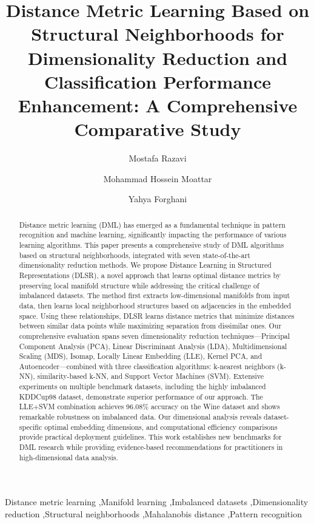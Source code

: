 \documentclass[review]{elsarticle}
\begin{document}
\begin{frontmatter}

\title{Distance Metric Learning Based on Structural Neighborhoods for Dimensionality Reduction and Classification Performance Enhancement: A Comprehensive Comparative Study}

\author[mymainaddress]{Mostafa Razavi}

\author[mymainaddress]{Mohammad Hossein Moattar}

\author[mymainaddress]{Yahya Forghani}

\address[mymainaddress]{Department of Computer Science, Islamic Azad University, Mashhad Branch, Mashhad, Iran}

\begin{abstract}
Distance metric learning (DML) has emerged as a fundamental technique in pattern recognition and machine learning, significantly impacting the performance of various learning algorithms. This paper presents a comprehensive study of DML algorithms based on structural neighborhoods, integrated with seven state-of-the-art dimensionality reduction methods. We propose Distance Learning in Structured Representations (DLSR), a novel approach that learns optimal distance metrics by preserving local manifold structure while addressing the critical challenge of imbalanced datasets. The method first extracts low-dimensional manifolds from input data, then learns local neighborhood structures based on adjacencies in the embedded space. Using these relationships, DLSR learns distance metrics that minimize distances between similar data points while maximizing separation from dissimilar ones. Our comprehensive evaluation spans seven dimensionality reduction techniques—Principal Component Analysis (PCA), Linear Discriminant Analysis (LDA), Multidimensional Scaling (MDS), Isomap, Locally Linear Embedding (LLE), Kernel PCA, and Autoencoder—combined with three classification algorithms: k-nearest neighbors (k-NN), similarity-based k-NN, and Support Vector Machines (SVM). Extensive experiments on multiple benchmark datasets, including the highly imbalanced KDDCup98 dataset, demonstrate superior performance of our approach. The LLE+SVM combination achieves 96.08\% accuracy on the Wine dataset and shows remarkable robustness on imbalanced data. Our dimensional analysis reveals dataset-specific optimal embedding dimensions, and computational efficiency comparisons provide practical deployment guidelines. This work establishes new benchmarks for DML research while providing evidence-based recommendations for practitioners in high-dimensional data analysis.
\end{abstract}

\begin{keyword}
Distance metric learning \sep Manifold learning \sep Imbalanced datasets \sep Dimensionality reduction \sep Structural neighborhoods \sep Mahalanobis distance \sep Pattern recognition
\end{keyword}

\end{frontmatter}
\end{document}
